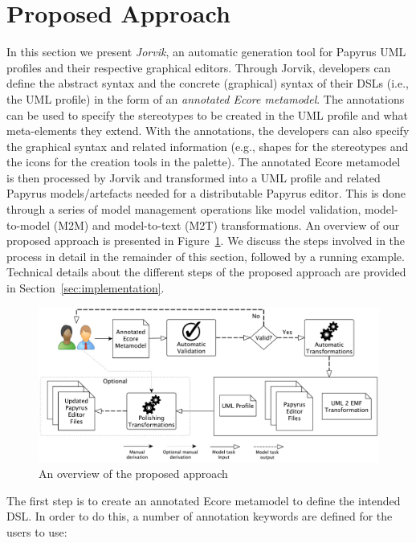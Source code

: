 \section{Proposed Approach}
\label{sec:approach}
In this section we present \textit{Jorvik}, an automatic generation tool for Papyrus UML profiles and their respective graphical editors.
Through Jorvik, developers can define the abstract syntax and the concrete (graphical) syntax of their DSLs (i.e., the UML profile) in the form of an \textit{annotated Ecore metamodel}.
The annotations can be used to specify the stereotypes to be created in the UML profile and what meta-elements they extend. 
With the annotations, the developers can also specify the graphical syntax and related information (e.g., shapes for the stereotypes and the icons for the creation tools in the palette). 
The annotated Ecore metamodel is then processed by Jorvik and transformed into a UML profile and related Papyrus models/artefacts needed for a distributable Papyrus editor. This is done through a series of model management operations like model validation, model-to-model (M2M) and model-to-text (M2T) transformations. An overview of our proposed approach is presented in Figure~\ref{fig:approachOverview}. 
We discuss the steps involved in the process in detail in the remainder of this section, followed by a running example. 
Technical details about the different steps of the proposed approach are provided in Section~\ref{sec:implementation}.

\begin{figure}
	\centering
	\includegraphics[width=1\textwidth]{diagrams/approachOverview.pdf}
	\caption{An overview of the proposed approach}
	\label{fig:approachOverview}
\end{figure}

The first step is to create an annotated Ecore metamodel to define the intended DSL.
In order to do this, a number of annotation keywords are defined for the users to use:

